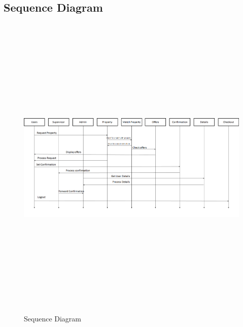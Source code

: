 \documentclass[11pt,fleqn]{book} %
\begin{document}
\subsection{Sequence Diagram}
 \begin{center}
	\begin{figure}[!htbp]
		\centering
		\includegraphics[width=15cm,height=15cm]{Pictures/Sequencediag.png}
	  \caption{Sequence Diagram}
	  \label{fig:seq1-dig}
	\end{figure}
\end{center}


\newpage
\end{document}
